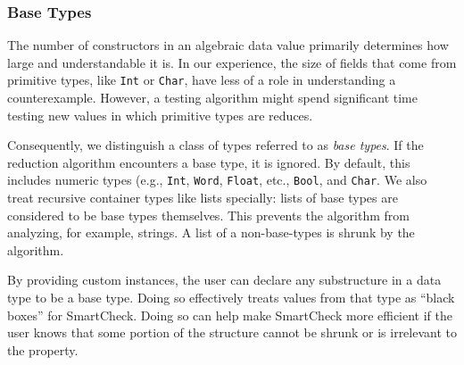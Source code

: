 \documentclass[10pt]{sigplanconf}
\newenvironment{code}{\begin{alltt}\small}{\end{alltt}}
\newcommand{\ttp}[1]{\texttt{#1}}
\begin{document}


\subsubsection{Base Types}\label{sec:base}

The number of constructors in an algebraic data value primarily determines how
large and understandable it is.  In our experience, the size of fields that come
from primitive types, like \ttp{Int} or \ttp{Char}, have less of a role in
understanding a counterexample.  However, a testing algorithm might spend
significant time testing new values in which primitive types are reduces.

Consequently, we distinguish a class of types referred to as \emph{base types}.
If the reduction algorithm encounters a base type, it is ignored.  By default,
this includes numeric types (e.g., \ttp{Int}, \ttp{Word}, \ttp{Float}, etc.,
\ttp{Bool}, and \ttp{Char}.  We also treat recursive container types like lists
specially: lists of base types are considered to be base types themselves.  This
prevents the algorithm from analyzing, for example, strings.  A list of a
non-base-types is shrunk by the algorithm.

By providing custom instances, the user can declare any substructure in a data
type to be a base type.  Doing so effectively treats values from that type as
``black boxes'' for SmartCheck.  Doing so can help make SmartCheck more
efficient if the user knows that some portion of the structure cannot be shrunk
or is irrelevant to the property.
\end{document}
